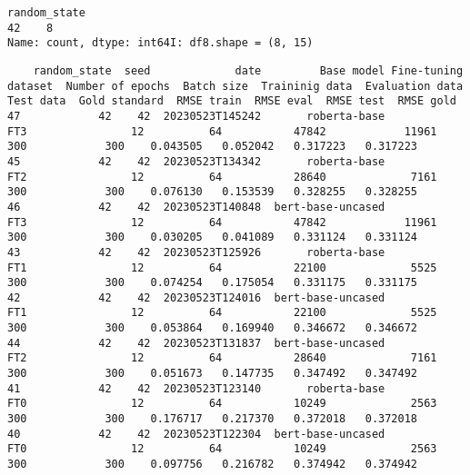 \documentclass[a4paper,10pt,onecolumn,oneside,openright]{article}
\begin{document}
\begin{verbatim}
random_state
42    8
Name: count, dtype: int64I: df8.shape = (8, 15)
\end{verbatim}
\begin{verbatim}
    random_state  seed             date         Base model Fine-tuning dataset  Number of epochs  Batch size  Traininig data  Evaluation data  Test data  Gold standard  RMSE train  RMSE eval  RMSE test  RMSE gold
47            42    42  20230523T145242       roberta-base                 FT3                12          64           47842            11961        300            300    0.043505   0.052042   0.317223   0.317223
45            42    42  20230523T134342       roberta-base                 FT2                12          64           28640             7161        300            300    0.076130   0.153539   0.328255   0.328255
46            42    42  20230523T140848  bert-base-uncased                 FT3                12          64           47842            11961        300            300    0.030205   0.041089   0.331124   0.331124
43            42    42  20230523T125926       roberta-base                 FT1                12          64           22100             5525        300            300    0.074254   0.175054   0.331175   0.331175
42            42    42  20230523T124016  bert-base-uncased                 FT1                12          64           22100             5525        300            300    0.053864   0.169940   0.346672   0.346672
44            42    42  20230523T131837  bert-base-uncased                 FT2                12          64           28640             7161        300            300    0.051673   0.147735   0.347492   0.347492
41            42    42  20230523T123140       roberta-base                 FT0                12          64           10249             2563        300            300    0.176717   0.217370   0.372018   0.372018
40            42    42  20230523T122304  bert-base-uncased                 FT0                12          64           10249             2563        300            300    0.097756   0.216782   0.374942   0.374942
\end{verbatim}
\end{document}
